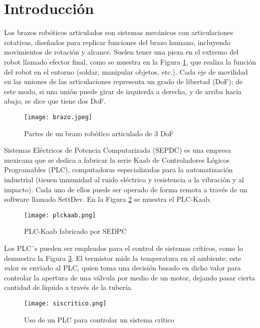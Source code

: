 \section{Introducci\'on}

Los brazos robóticos articulados son sistemas mecánicos con articulaciones rotativas, diseñados para replicar funciones del brazo humano, incluyendo movimientos de rotación y alcance. Suelen tener una pieza en el extremo del robot llamado efector final, como se muestra en la Figura \ref{fig:brazoR}, que realiza la función del robot en el entorno (soldar, manipular objetos, etc.). Cada eje de movilidad en las uniones de las articulaciones representa un grado de libertad (DoF); de este modo, si una unión puede girar de izquierda a derecha, y de arriba hacia abajo, se dice que tiene dos DoF.

\vspace{1cm}

\begin{figure}[htb]
	\centering
	\texttt{[image: brazo.jpeg]}
	\caption{Partes de un brazo robótico articulado de 3 DoF}
	\label{fig:brazoR}
\end{figure}

\newpage
Sistemas Eléctricos de Potencia Computarizada (SEPDC) es una empresa mexicana que se dedica a fabricar la serie Kaab de Controladores Lógicos Programables (PLC), computadoras especializadas para la automatización industrial (tienen inmunidad al ruido eléctrico y resistencia a la vibración y al impacto). Cada uno de ellos puede ser operado de forma remota a través de un software llamado SettDev. En la Figura \ref{fig:plc} se muestra el PLC-Kaab.

\begin{figure}[htb]
	\centering
	\texttt{[image: plckaab.png]}
	\caption{PLC-Kaab fabricado por SEDPC}
	\label{fig:plc}
\end{figure}

Los PLC´s pueden ser empleados para el control de sistemas críticos, como lo demuestra la Figura \ref{fig:siscritico}. El termistor mide la temperatura en el ambiente; este valor es enviado al PLC, quien toma una decisión basado en dicho valor para controlar la apertura de una válvula por medio de un motor, dejando pasar cierta cantidad de líquido a través de la tubería.

\begin{figure}[htb]
	\centering
	\texttt{[image: siscritico.png]}
	\caption{Uso de un PLC para controlar un sistema crítico}
	\label{fig:siscritico}
\end{figure}